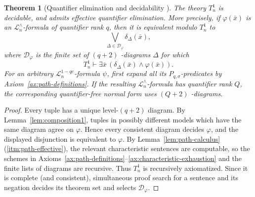 \documentclass{amsart}
\newtheorem{theorem}{Theorem}
\theoremstyle{definition}
\begin{document}
\begin{theorem}[Quantifier elimination and decidability \MakeUppercase{}]\label{thm:1-qe}
    The theory $T_n^1$ is decidable, and admits effective quantifier elimination. More precisely, if $\varphi(\bar x)$ is an $\mathcal L_n^\wedge$-formula of quantifier rank $q$, then it is equivalent modulo $T_n^1$ to
    $$\bigvee_{\Delta\in\mathcal D_\varphi}\delta_\Delta(\bar x),$$
    where $\mathcal D_\varphi$ is the finite set of $(q+2)$ \MakeUppercase{}-diagrams $\Delta$ for which
    $$T_n^1\vdash\exists\bar x\,(\delta_\Delta(\bar x)\wedge\varphi(\bar x)).$$
    For an arbitrary $\mathcal L_n^{1-qe}$-formula $\psi$, first expand all its $P_{q,\sigma}$-predicates by Axiom~\ref{ax:path-definitions}. If the resulting $\mathcal L_n^\wedge$-formula has quantifier rank $Q$, the corresponding quantifier-free normal form uses $(Q+2)$ \MakeUppercase{}-diagrams.
\end{theorem}
\begin{proof}
    Every tuple has a unique level-$(q+2)$ diagram. By Lemma~\ref{lem:composition1}, tuples in possibly different models which have the same diagram agree on $\varphi$. Hence every consistent diagram decides $\varphi$, and the displayed disjunction is equivalent to $\varphi$. By Lemma~\ref{lem:path-calculus}(\ref{itm:path-effective}), the relevant characteristic sentences are computable, so the schemes in Axioms~\ref{ax:path-definitions}--\ref{ax:characteristic-exhaustion} and the finite lists of diagrams are recursive. Thus $T_n^1$ is recursively axiomatized. Since it is complete (and consistent), simultaneous proof search for a sentence and its negation decides its theorem set and selects $\mathcal D_\varphi$.
\end{proof}
\end{document}
